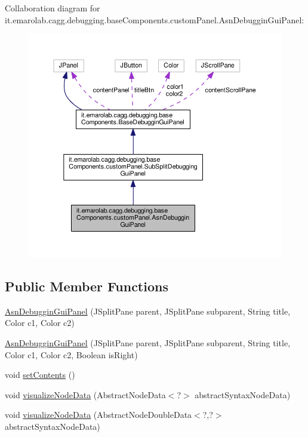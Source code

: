 Collaboration diagram for it.\-emarolab.\-cagg.\-debugging.\-base\-Components.\-custom\-Panel.\-Asn\-Debuggin\-Gui\-Panel\-:\nopagebreak
\begin{figure}[H]
\begin{center}
\leavevmode
\includegraphics[width=350pt]{classit_1_1emarolab_1_1cagg_1_1debugging_1_1baseComponents_1_1customPanel_1_1AsnDebugginGuiPanel__coll__graph}
\end{center}
\end{figure}
\subsection*{Public Member Functions}
\begin{DoxyCompactItemize}
\item 
\hyperlink{classit_1_1emarolab_1_1cagg_1_1debugging_1_1baseComponents_1_1customPanel_1_1AsnDebugginGuiPanel_a67432bfaf6d77a67f956305a64f45ca9}{Asn\-Debuggin\-Gui\-Panel} (J\-Split\-Pane parent, J\-Split\-Pane subparent, String title, Color c1, Color c2)
\item 
\hyperlink{classit_1_1emarolab_1_1cagg_1_1debugging_1_1baseComponents_1_1customPanel_1_1AsnDebugginGuiPanel_a7ed65064466800378b45eb522d4b48f3}{Asn\-Debuggin\-Gui\-Panel} (J\-Split\-Pane parent, J\-Split\-Pane subparent, String title, Color c1, Color c2, Boolean is\-Right)
\item 
void \hyperlink{classit_1_1emarolab_1_1cagg_1_1debugging_1_1baseComponents_1_1customPanel_1_1AsnDebugginGuiPanel_a8f7d46a8c5f8d448c70a53427b403b3f}{set\-Contents} ()
\item 
void \hyperlink{classit_1_1emarolab_1_1cagg_1_1debugging_1_1baseComponents_1_1customPanel_1_1AsnDebugginGuiPanel_af72560eb6abede85fcb3540deef5f45e}{visualize\-Node\-Data} (Abstract\-Node\-Data$<$?$>$ abstract\-Syntax\-Node\-Data)
\item 
void \hyperlink{classit_1_1emarolab_1_1cagg_1_1debugging_1_1baseComponents_1_1customPanel_1_1AsnDebugginGuiPanel_a82c16afc3471d21d926ecb6a29386fd0}{visualize\-Node\-Data} (Abstract\-Node\-Double\-Data$<$?,?$>$ abstract\-Syntax\-Node\-Data)
\end{DoxyCompactItemize}
